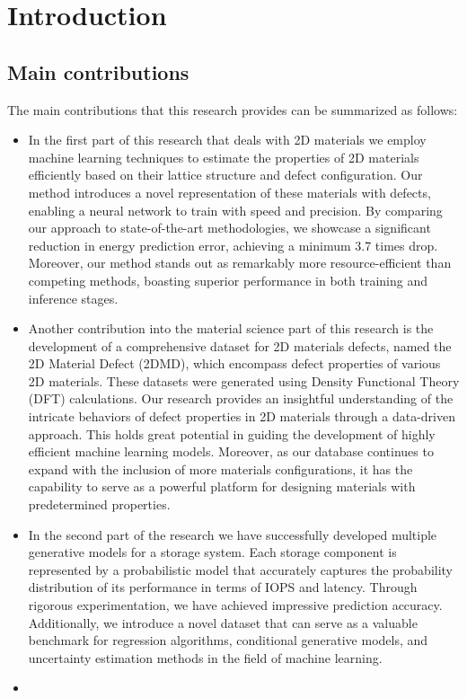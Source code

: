 \section{Introduction}

\subsection{Main contributions}
The main contributions that this research provides can be summarized
as follows:
\begin{itemize}
    \item In the first part of this research that deals with 2D
      materials we employ machine learning techniques to estimate the
      properties of 2D materials efficiently based on their lattice
      structure and defect configuration. Our method introduces a
      novel representation of these materials with defects, enabling a
      neural network to train with speed and precision. By comparing
      our approach to state-of-the-art methodologies, we showcase a
      significant reduction in energy prediction error, achieving a
      minimum 3.7 times drop. Moreover, our method stands out as
      remarkably more resource-efficient than competing methods,
      boasting superior performance in both training and inference
      stages.
    \item Another contribution into the material science part of this
      research is the development of a comprehensive dataset for 2D
      materials defects, named the 2D Material Defect (2DMD), which
      encompass defect properties of various 2D materials. These
      datasets were generated using Density Functional Theory (DFT)
      calculations. Our research provides an insightful understanding
      of the intricate behaviors of defect properties in 2D materials
      through a data-driven approach. This holds great potential in
      guiding the development of highly efficient machine learning
      models. Moreover, as our database continues to expand with the
      inclusion of more materials configurations, it has the
      capability to serve as a powerful platform for designing
      materials with predetermined properties.
    \item In the second part of the research we have successfully
      developed multiple generative models for a storage system. Each
      storage component is represented by a probabilistic model that
      accurately captures the probability distribution of its
      performance in terms of IOPS and latency. Through rigorous
      experimentation, we have achieved impressive prediction
      accuracy. Additionally, we introduce a novel dataset that can
      serve as a valuable benchmark for regression algorithms,
      conditional generative models, and uncertainty estimation
      methods in the field of machine learning.
      
    \item 
\end{itemize}

